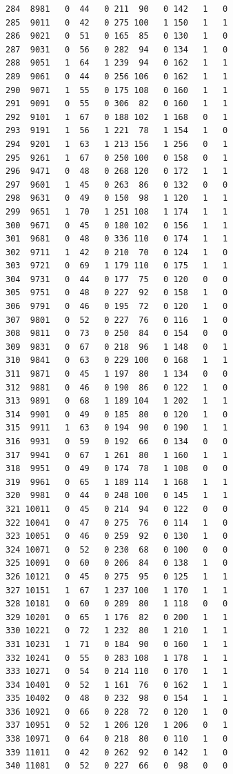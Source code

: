 \documentclass[
  letterpaper,
]{scrbook}
\begin{document}
\begin{verbatim}
284  8981   0  44   0 211  90   0 142   1   0
285  9011   0  42   0 275 100   1 150   1   1
286  9021   0  51   0 165  85   0 130   1   0
287  9031   0  56   0 282  94   0 134   1   0
288  9051   1  64   1 239  94   0 162   1   1
289  9061   0  44   0 256 106   0 162   1   1
290  9071   1  55   0 175 108   0 160   1   1
291  9091   0  55   0 306  82   0 160   1   1
292  9101   1  67   0 188 102   1 168   0   1
293  9191   1  56   1 221  78   1 154   1   0
294  9201   1  63   1 213 156   1 256   0   1
295  9261   1  67   0 250 100   0 158   0   1
296  9471   0  48   0 268 120   0 172   1   1
297  9601   1  45   0 263  86   0 132   0   0
298  9631   0  49   0 150  98   1 120   1   1
299  9651   1  70   1 251 108   1 174   1   1
300  9671   0  45   0 180 102   0 156   1   1
301  9681   0  48   0 336 110   0 174   1   1
302  9711   1  42   0 210  70   0 124   1   0
303  9721   0  69   1 179 110   0 175   1   1
304  9731   0  44   0 177  75   0 120   0   0
305  9751   0  48   0 227  92   0 158   1   0
306  9791   0  46   0 195  72   0 120   1   0
307  9801   0  52   0 227  76   0 116   1   0
308  9811   0  73   0 250  84   0 154   0   0
309  9831   0  67   0 218  96   1 148   0   1
310  9841   0  63   0 229 100   0 168   1   1
311  9871   0  45   1 197  80   1 134   0   0
312  9881   0  46   0 190  86   0 122   1   0
313  9891   0  68   1 189 104   1 202   1   1
314  9901   0  49   0 185  80   0 120   1   0
315  9911   1  63   0 194  90   0 190   1   1
316  9931   0  59   0 192  66   0 134   0   0
317  9941   0  67   1 261  80   1 160   1   1
318  9951   0  49   0 174  78   1 108   0   0
319  9961   0  65   1 189 114   1 168   1   1
320  9981   0  44   0 248 100   0 145   1   1
321 10011   0  45   0 214  94   0 122   0   0
322 10041   0  47   0 275  76   0 114   1   0
323 10051   0  46   0 259  92   0 130   1   0
324 10071   0  52   0 230  68   0 100   0   0
325 10091   0  60   0 206  84   0 138   1   0
326 10121   0  45   0 275  95   0 125   1   1
327 10151   1  67   1 237 100   1 170   1   1
328 10181   0  60   0 289  80   1 118   0   0
329 10201   0  65   1 176  82   0 200   1   1
330 10221   0  72   1 232  80   1 210   1   1
331 10231   1  71   0 184  90   0 160   1   1
332 10241   0  55   0 283 108   1 178   1   1
333 10271   0  54   0 214 110   0 170   1   1
334 10401   0  52   1 161  76   0 162   1   1
335 10402   0  48   0 232  98   0 154   1   1
336 10921   0  66   0 228  72   0 120   1   0
337 10951   0  52   1 206 120   1 206   0   1
338 10971   0  64   0 218  80   0 110   1   0
339 11011   0  42   0 262  92   0 142   1   0
340 11081   0  52   0 227  66   0  98   0   0

\end{verbatim}
\end{document}
